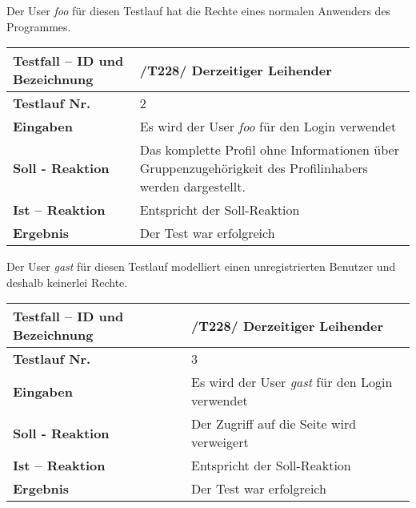 Der User \textit{foo} für diesen Testlauf hat die Rechte eines normalen Anwenders
des Programmes. 

\begin{longtable}{|p{5cm}|p{10cm}|}
\hline
\textbf{Testfall -- ID und Bezeichnung} & \textnormal{/T228/ Derzeitiger
Leihender} \\
\hline
\textbf{Testlauf Nr.} & \textnormal{2} \\
\hline
\textbf{Eingaben} & \textnormal{Es wird der User \textit{foo} für den Login verwendet} \\
\hline
\textbf{Soll - Reaktion} & \textnormal{Das komplette Profil ohne Informationen über
Gruppenzugehörigkeit des Profilinhabers werden dargestellt.
} \\
\hline
\textbf{Ist -- Reaktion} & \textnormal{Entspricht der Soll-Reaktion} \\
\hline
\textbf{Ergebnis} & \textnormal{Der Test war erfolgreich} \\
\hline
 \end{longtable}

Der User \textit{gast} für diesen Testlauf modelliert einen unregistrierten
Benutzer und deshalb keinerlei Rechte. 

\begin{longtable}{|p{5cm}|p{10cm}|}
\hline
\textbf{Testfall -- ID und Bezeichnung} & \textnormal{/T228/ Derzeitiger
Leihender} \\
\hline
\textbf{Testlauf Nr.} & \textnormal{3} \\
\hline
\textbf{Eingaben} & \textnormal{Es wird der User \textit{gast} für den Login verwendet} \\
\hline
\textbf{Soll - Reaktion} & \textnormal{Der Zugriff auf die Seite wird verweigert
} \\
\hline
\textbf{Ist -- Reaktion} & \textnormal{Entspricht der Soll-Reaktion} \\
\hline
\textbf{Ergebnis} & \textnormal{Der Test war erfolgreich} \\
\hline
 \end{longtable}

